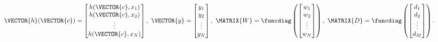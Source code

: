 \begin{myproofT}
\begin{equation}
\VECTOR{h}(\VECTOR{c})=\begin{bmatrix}
h(\VECTOR{c},x_1)\\ 
h(\VECTOR{c},x_2)\\ 
\vdots\\ 
h(\VECTOR{c},x_N)
\end{bmatrix},
~
\VECTOR{y}=\begin{bmatrix}
y_1\\ 
y_2\\ 
\vdots\\ 
y_N
\end{bmatrix},
~
\MATRIX{W}=\funcdiag\left(\begin{bmatrix}
w_1\\ 
w_2\\ 
\vdots\\ 
w_N
\end{bmatrix}\right),
~
\MATRIX{D}=\funcdiag\left(\begin{bmatrix}
d_1\\ 
d_2\\ 
\vdots\\ 
d_M
\end{bmatrix}\right).
\end{equation}


\end{myproofT}
